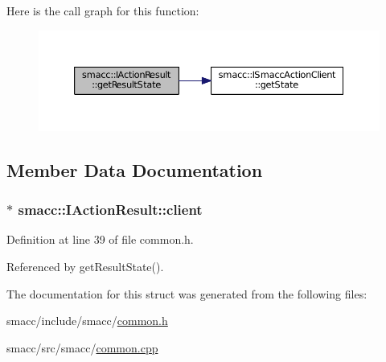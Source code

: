 Here is the call graph for this function\+:
\nopagebreak
\begin{figure}[H]
\begin{center}
\leavevmode
\includegraphics[width=350pt]{structsmacc_1_1IActionResult_af33869a3b1711af070597b8fe605ce70_cgraph}
\end{center}
\end{figure}




\subsection{Member Data Documentation}
\subsubsection[{\texorpdfstring{client}{client}}]{$\ast$ smacc\+::\+I\+Action\+Result\+::client}\hypertarget{structsmacc_1_1IActionResult_a8768f186e223b75188025f318d156ee2}{}\label{structsmacc_1_1IActionResult_a8768f186e223b75188025f318d156ee2}


Definition at line 39 of file common.\+h.



Referenced by get\+Result\+State().



The documentation for this struct was generated from the following files\+:\begin{DoxyCompactItemize}
\item 
smacc/include/smacc/\hyperlink{common_8h}{common.\+h}\item 
smacc/src/smacc/\hyperlink{common_8cpp}{common.\+cpp}\end{DoxyCompactItemize}
